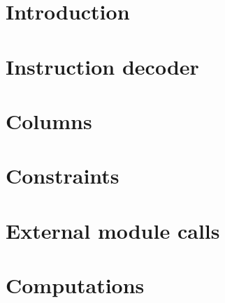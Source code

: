 

\section{Introduction}             \label{mxp: intro}                       
\section{Instruction decoder}      \label{mxp: instruction decoder}         
\section{Columns}                  \label{mxp: columns}                     
\section{Constraints}              \label{mxp: constraints}                 
\section{External module calls}    \label{mxp: calls}                       
\section{Computations}             \label{mxp: computations}                
